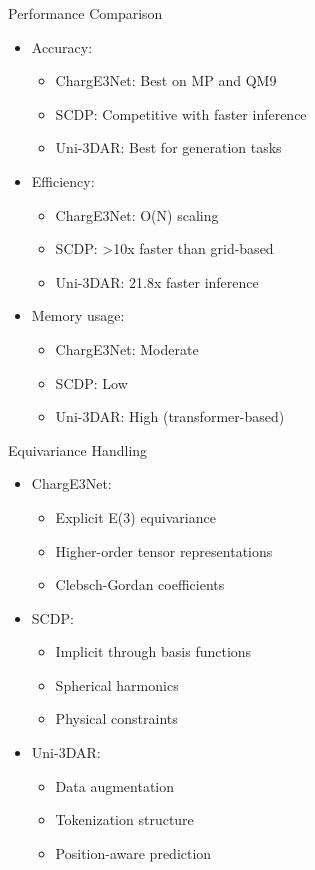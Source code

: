 \begin{frame}{Performance Comparison}
    \begin{itemize}
        \item Accuracy:
        \begin{itemize}
            \item ChargE3Net: Best on MP and QM9
            \item SCDP: Competitive with faster inference
            \item Uni-3DAR: Best for generation tasks
        \end{itemize}
        \item Efficiency:
        \begin{itemize}
            \item ChargE3Net: O(N) scaling
            \item SCDP: >10x faster than grid-based
            \item Uni-3DAR: 21.8x faster inference
        \end{itemize}
        \item Memory usage:
        \begin{itemize}
            \item ChargE3Net: Moderate
            \item SCDP: Low
            \item Uni-3DAR: High (transformer-based)
        \end{itemize}
    \end{itemize}
\end{frame}

\begin{frame}{Equivariance Handling}
    \begin{itemize}
        \item ChargE3Net:
        \begin{itemize}
            \item Explicit E(3) equivariance
            \item Higher-order tensor representations
            \item Clebsch-Gordan coefficients
        \end{itemize}
        \item SCDP:
        \begin{itemize}
            \item Implicit through basis functions
            \item Spherical harmonics
            \item Physical constraints
        \end{itemize}
        \item Uni-3DAR:
        \begin{itemize}
            \item Data augmentation
            \item Tokenization structure
            \item Position-aware prediction
        \end{itemize}
    \end{itemize}
\end{frame}

